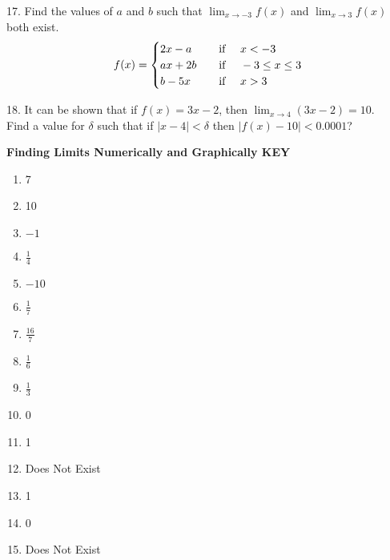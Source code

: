 \documentclass{article}
\begin{document}
17. Find the values of $a$ and $b$ such that $\lim_{x \to -3}f(x)$ and $\lim_{x \to 3}f(x)$ both exist.
\[ 
f(x) = \begin{cases}
2x - a  \quad   &   \text{if \quad} x < -3  \\ 
ax + 2b \quad   &   \text{if \quad} -3 \leq x \leq 3    \\
b - 5x  \quad   &   \text{if \quad} x > 3   \\ 
\end{cases}
\]
\vspace{1.5in}

18. It can be shown that if $f(x) = 3x-2$, then $\lim_{x \to 4} (3x - 2) = 10$. \newline\\ 

Find a value for $\delta$ such that if $|x - 4| < \delta$ then $|f(x)-10| < 0.0001$?



\newpage


\textbf{Finding Limits Numerically and Graphically KEY}


\begin{enumerate}
    \item 7
    \item 10
    \item $-1$
    \item $\frac{1}{4}$
    \item $-10$
    \item $\frac{1}{7}$
    \item $\frac{16}{7}$
    \item $\frac{1}{6}$
    \item $\frac{1}{3}$
    \item 0
    \item 1
    \item Does Not Exist
    \item 1
    \item 0
    \item Does Not Exist
\end{enumerate}
\end{document}
